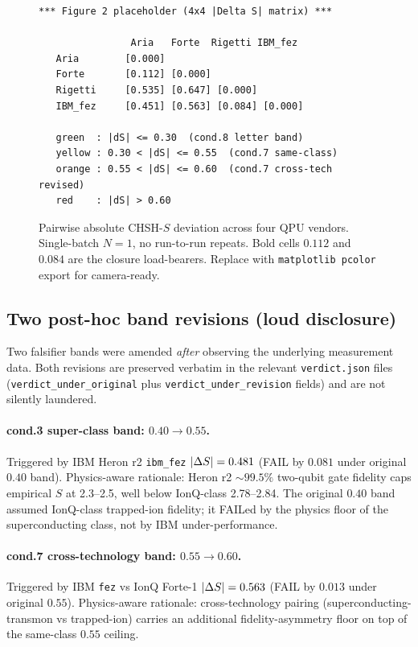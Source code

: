 \begin{figure}[htbp]
\centering
\begin{lstlisting}[basicstyle=\ttfamily\tiny,frame=single,framesep=4pt]
*** Figure 2 placeholder (4x4 |Delta S| matrix) ***

                Aria   Forte  Rigetti IBM_fez
   Aria        [0.000]
   Forte       [0.112] [0.000]
   Rigetti     [0.535] [0.647] [0.000]
   IBM_fez     [0.451] [0.563] [0.084] [0.000]

   green  : |dS| <= 0.30  (cond.8 letter band)
   yellow : 0.30 < |dS| <= 0.55  (cond.7 same-class)
   orange : 0.55 < |dS| <= 0.60  (cond.7 cross-tech revised)
   red    : |dS| > 0.60
\end{lstlisting}
\caption{Pairwise absolute CHSH-$S$ deviation across four QPU vendors.
Single-batch $N=1$, no run-to-run repeats. Bold cells $0.112$ and
$0.084$ are the closure load-bearers. Replace with \texttt{matplotlib
pcolor} export for camera-ready.}
\label{fig:xvendor_heatmap}
\end{figure}

\subsection{Two post-hoc band revisions (loud disclosure)}\label{sec:band-revise}

Two falsifier bands were amended \emph{after} observing the
underlying measurement data. Both revisions are preserved verbatim
in the relevant \texttt{verdict.json} files
(\texttt{verdict\_under\_original} plus
\texttt{verdict\_under\_revision} fields) and are not silently
laundered.

\paragraph{cond.3 super-class band: $0.40 \rightarrow 0.55$.}
Triggered by IBM Heron r2 \texttt{ibm\_fez} $\lvert\Delta S\rvert = 0.481$ (FAIL by
$0.081$ under original $0.40$ band). Physics-aware rationale: Heron
r2 $\sim 99.5\%$ two-qubit gate fidelity caps empirical $S$ at
2.3--2.5, well below IonQ-class 2.78--2.84. The original $0.40$ band
assumed IonQ-class trapped-ion fidelity; it FAILed by the physics
floor of the superconducting class, not by IBM under-performance.

\paragraph{cond.7 cross-technology band: $0.55 \rightarrow 0.60$.}
Triggered by IBM \texttt{fez} vs IonQ Forte-1 $\lvert\Delta S\rvert = 0.563$ (FAIL by
$0.013$ under original $0.55$). Physics-aware rationale:
cross-technology pairing (superconducting-transmon vs trapped-ion)
carries an additional fidelity-asymmetry floor on top of the
same-class $0.55$ ceiling.

